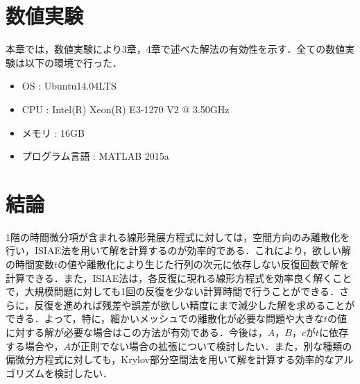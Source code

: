 \documentclass[a4paper,12pt]{nodlabpabw}
\begin{document}
\chapter{数値実験}
本章では，数値実験により3章，4章で述べた解法の有効性を示す．全ての数値実験は以下の環境で行った．
\begin{itemize}
\item OS : Ubuntu14.04LTS
\item CPU : Intel(R) Xeon(R) E3-1270 V2 @ 3.50GHz
\item メモリ : 16GB
\item プログラム言語 : MATLAB 2015a
\end{itemize}
%
\chapter{結論}
1階の時間微分項が含まれる線形発展方程式に対しては，空間方向のみ離散化を行い，ISIAE法を用いて解を計算するのが効率的である．これにより，欲しい解の時間変数$t$の値や離散化により生じた行列の次元に依存しない反復回数で解を計算できる．また，ISIAE法は，各反復に現れる線形方程式を効率良く解くことで，大規模問題に対しても1回の反復を少ない計算時間で行うことができる．さらに，反復を進めれば残差や誤差が欲しい精度にまで減少した解を求めることができる．よって，特に，細かいメッシュでの離散化が必要な問題や大きな$t$の値に対する解が必要な場合はこの方法が有効である．今後は，$A$，$B$，$c$が$t$に依存する場合や，$A$が正則でない場合の拡張について検討したい．また，別な種類の偏微分方程式に対しても，Krylov部分空間法を用いて解を計算する効率的なアルゴリズムを検討したい．
%
\end{document}
